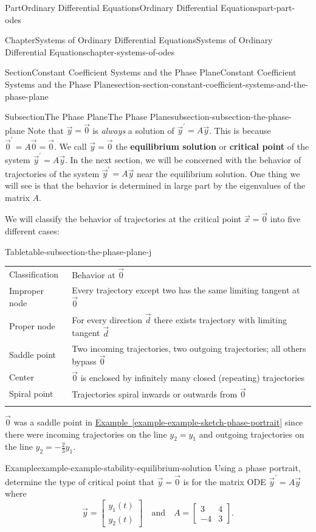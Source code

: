 \documentclass[twoside,10pt,]{book}
\newcommand{\tabularfont}{\relax}
\newcommand{\xreffont}{\relax}
\newcommand{\terminology}[1]{\textbf{#1}}
\numberwithin{equation}{part}
\newcommand{\hrulethick} {\noalign{\hrule height 0.11em}}
\begin{document}
\begin{partptx}{Part}{Ordinary Differential Equations}{}{Ordinary Differential Equations}{}{}{part-part-odes}
\begin{chapterptx}{Chapter}{Systems of Ordinary Differential Equations}{}{Systems of Ordinary Differential Equations}{}{}{chapter-systems-of-odes}
\begin{sectionptx}{Section}{Constant Coefficient Systems and the Phase Plane}{}{Constant Coefficient Systems and the Phase Plane}{}{}{section-section-constant-coefficient-systems-and-the-phase-plane}
\begin{subsectionptx}{Subsection}{The Phase Plane}{}{The Phase Plane}{}{}{subsection-subsection-the-phase-plane}
Note that \(\vec{y}=\vec{0}\) is \emph{always} a solution of \(\vec{y}^\prime=A\vec{y}\). This is because \(\vec{0}^\prime=A\vec{0} = \vec{0}\). We call \(\vec{y} = \vec{0}\) the \terminology{equilibrium solution} or \terminology{critical point} of the system \(\vec{y}^\prime=A\vec{y}\). In the next section, we will be concerned with the behavior of trajectories of the system \(\vec{y}^\prime=A\vec{y}\) near the equilibrium solution. One thing we will see is that the behavior is determined in large part by the eigenvalues of the matrix \(A\).%
\par
We will classify the behavior of trajectories at the critical point \(\vec{x} = \vec{0}\) into five different cases:%
\begin{tableptx}{Table}{\textbf{}}{table-subsection-the-phase-plane-j}{}%
\centering%
{\tabularfont%
\begin{tabular}{ll}\hrulethick
Classification&Behavior at \(\vec{0}\)\tabularnewline\hrulethick
Improper node&Every trajectory except two has the same limiting tangent at \(\vec{0}\)\tabularnewline[0pt]
Proper node&For every direction \(\vec{d}\) there exists trajectory with limiting tangent \(\vec{d}\)\tabularnewline[0pt]
Saddle point&Two incoming trajectories, two outgoing trajectories; all others bypass \(\vec{0}\)\tabularnewline[0pt]
Center&\(\vec{0}\) is enclosed by infinitely many closed (repeating) trajectories\tabularnewline[0pt]
Spiral point&Trajectories spiral inwards or outwards from \(\vec{0}\)\tabularnewline\hrulethick
\end{tabular}
}%
\end{tableptx}%
\(\vec{0}\) was a saddle point in \hyperref[example-example-sketch-phase-portrait]{Example~{\xreffont\ref{example-example-sketch-phase-portrait}}} since there were incoming trajectories on the line \(y_{2} = y_{1}\) and outgoing trajectories on the line \(y_{2} = -\frac{2}{3}y_{1}\).%
\begin{example}{Example}{}{example-example-stability-equilibrium-solution}%
Using a phase portrait, determine the type of critical point that \(\vec{y} = \vec{0}\) is for the matrix ODE \(\vec{y}^\prime=A\vec{y}\) where%
\begin{equation*}
\vec{y} = \begin{bmatrix}y_{1}(t) \\ y_{2}(t)\end{bmatrix}\quad\text{and}\quad A = \begin{bmatrix}3 &  4 \\ -4 &  3\end{bmatrix}.

\end{equation*}
\end{example}
\end{subsectionptx}
\end{sectionptx}
\end{chapterptx}
\end{partptx}
\end{document}
